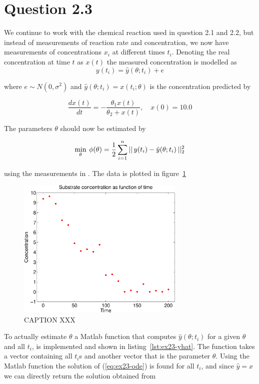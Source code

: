 \section*{Question 2.3}

We continue to work with the chemical reaction used in question 2.1 and 2.2, but instead of measurements of reaction rate and concentration, we now have measurements of concentrations $x_i$ at different times $t_i$. Denoting the real concentration at time $t$ as $x(t)$ the measured concentration is modelled as
\begin{equation*}
    y(t_i) = \hat{y}(\theta; t_i) + e
\end{equation*}

where $e\sim N(0, \sigma^2)$ and $\hat{y}(\theta; t_i)=x(t_i; \theta)$ is the concentration predicted by

\begin{equation}\label{eq:ex23-ode}
    \frac{dx(t)}{dt} = -\frac{\theta_1 x(t)}{\theta_2 + x(t)}, \quad x(0) = 10.0
\end{equation}

The parameters $\theta$ should now be estimated by

\begin{equation}\label{eq:ex23-min}
    \min_\theta\:\phi(\theta) = \frac{1}{2}\sum_{i=1}^n ||\,y(t_i) - \hat{y}(\theta;t_i)\,||^2_2
\end{equation}

using the measurements in . The data is plotted in figure~\ref{fig:ex23-data}

\begin{figure}[ht]
    \centering
    \includegraphics[width=80mm]{../media/ex23-data.pdf}
    \caption{CAPTION XXX}
    \label{fig:ex23-data}
\end{figure}

To actually estimate $\theta$ a Matlab function that computes $\hat{y}(\theta; t_i)$ for a given $\theta$ and all $t_i$, is implemented and shown in listing~\ref{lst:ex23-yhat}. The function takes a vector  containing all $t_i$s and another vector  that is the parameter $\theta$. Using the Matlab function  the solution of (\ref{eq:ex23-ode}) is found for all $t_i$, and since $\hat{y}=x$ we can directly return the solution obtained from 

